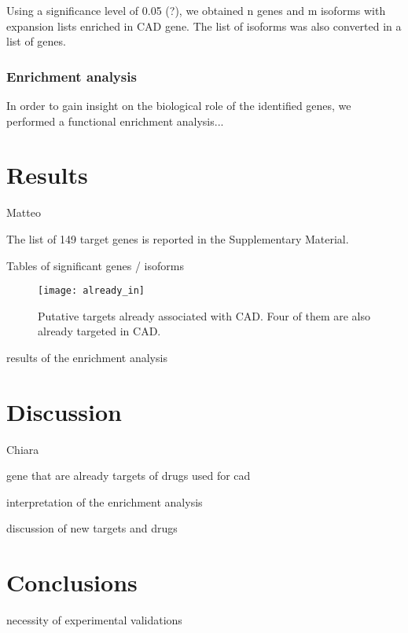 \documentclass[fleqn,10pt]{SelfArx} %
\begin{document}
Using a significance level of 0.05 (?), we obtained n genes and m isoforms with expansion lists enriched in CAD gene. The list of isoforms was also converted in a list of genes.

\subsubsection{Enrichment analysis}

In order to gain insight on the biological role of the identified genes, we performed a functional enrichment analysis...


\section*{Results}
Matteo

The list of 149 target genes is reported in the Supplementary Material.

Tables of significant genes / isoforms 

\begin{figure}[ht]
	\texttt{[image: already\_in]}
	\smallskip
	\caption{Putative targets already associated with CAD. Four of them are also already targeted in CAD.}
\end{figure}

results of the enrichment analysis

\section*{Discussion}
Chiara

gene that are already targets of drugs used for cad

interpretation of the enrichment analysis

discussion of new targets and drugs

\section*{Conclusions}

necessity of experimental validations
\end{document}
